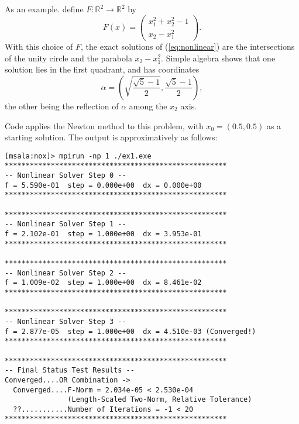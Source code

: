 As an example. define $F : \mathbb{R}^2 \rightarrow \mathbb{R}^2$ by
\[
F(x) = 
\begin{pmatrix}
x_1^2 + x_2^2 -1 \\
x_2 - x_1^2
\end{pmatrix}.
\]
With this choice of $F$, the exact solutions of (\ref{eq:nonlinear}) are
the intersections of the unity circle and the parabola $x_2 -
x_1^2$. Simple algebra shows that one solution lies in the first
quadrant, and has coordinates
\[
\alpha = \left( \sqrt{\frac{\sqrt{5}-1}{2}}, \frac{\sqrt{5}-1}{2} \right),
\]
the other being the reflection of $\alpha$ among the $x_2$ axis.

Code  applies the Newton method to this problem,
with $x_0 = (0.5, 0.5)$ as a starting solution. The output is
approximatively as follows:
\begin{verbatim}
[msala:nox]> mpirun -np 1 ./ex1.exe
*****************************************************
-- Nonlinear Solver Step 0 --
f = 5.590e-01  step = 0.000e+00  dx = 0.000e+00
*****************************************************

*****************************************************
-- Nonlinear Solver Step 1 --
f = 2.102e-01  step = 1.000e+00  dx = 3.953e-01
*****************************************************

*****************************************************
-- Nonlinear Solver Step 2 --
f = 1.009e-02  step = 1.000e+00  dx = 8.461e-02
*****************************************************

*****************************************************
-- Nonlinear Solver Step 3 --
f = 2.877e-05  step = 1.000e+00  dx = 4.510e-03 (Converged!)
*****************************************************

*****************************************************
-- Final Status Test Results --
Converged....OR Combination ->
  Converged....F-Norm = 2.034e-05 < 2.530e-04
               (Length-Scaled Two-Norm, Relative Tolerance)
  ??...........Number of Iterations = -1 < 20
*****************************************************


\end{verbatim}
